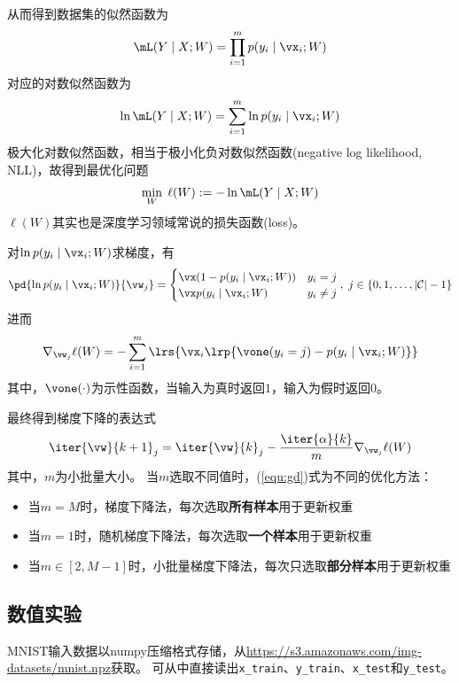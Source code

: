 \documentclass[logo,reportComp]{thesis}
\begin{document}
从而得到数据集的似然函数为
\[\mL(Y\mid X;W)=\prod_{i=1}^m p(y_i\mid\vx_i;W)\]
对应的对数似然函数为
\[\ln\mL(Y\mid X;W)=\sum_{i=1}^m\ln p(y_i\mid\vx_i;W)\]
极大化对数似然函数，相当于极小化负对数似然函数(negative log likelihood, NLL)，故得到最优化问题
\begin{equation}
\min_W \;\ell(W):=-\ln\mL(Y\mid X;W)
\end{equation}
$\ell(W)$其实也是深度学习领域常说的损失函数(loss)。

对$\ln p(y_i\mid\vx_i;W)$求梯度，有
\[\pd{\ln p(y_i\mid\vx_i;W)}{\vw_j}=
\begin{cases}
\vx(1-p(y_i\mid\vx_i;W)) & y_i=j\\
\vx p(y_i\mid\vx_i;W) & y_i\ne j
\end{cases},\;j\in\{0,1,\ldots,|\mathcal{C}|-1\}\]
进而
\begin{equation}
\nabla_{\vw_j}\ell(W)=-\sum_{i=1}^m\lrs{\vx_i\lrp{\vone(y_i=j)-p(y_i\mid\vx_i;W)}}
\end{equation}
其中，$\vone(\cdot)$为示性函数，当输入为真时返回$1$，输入为假时返回$0$。

最终得到梯度下降的表达式
\begin{equation}
\label{equ:gd}
\iter{\vw}{k+1}_j=\iter{\vw}{k}_j-\frac{\iter{\alpha}{k}}{m}\nabla_{\vw_j}\ell(W)
\end{equation}
其中，$m$为小批量大小。
当$m$选取不同值时，(\ref{equ:gd})式为不同的优化方法：
\begin{itemize}
\item 当$m=M$时，梯度下降法，每次选取\textbf{所有样本}用于更新权重
\item 当$m=1$时，随机梯度下降法，每次选取\textbf{一个样本}用于更新权重
\item 当$m\in[2,M-1]$时，小批量梯度下降法，每次只选取\textbf{部分样本}用于更新权重
\end{itemize}

\subsection{数值实验}
MNIST输入数据以numpy压缩格式存储，从\url{https://s3.amazonaws.com/img-datasets/mnist.npz}获取。
可从中直接读出\verb'x_train'、\verb'y_train'、\verb'x_test'和\verb'y_test'。
\end{document}
